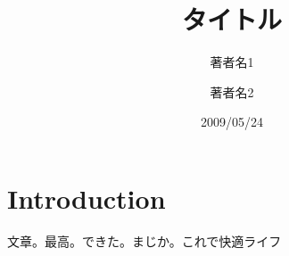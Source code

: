 \documentclass[11pt,a4paper,uplatex]{ujarticle}
\title{タイトル}
\author{著者名1 \and 著者名2}
\date{2009/05/24}
\begin{document}
  \maketitle

  \section{Introduction}
  文章。最高。できた。まじか。これで快適ライフ

  \section{}
\end{document}

